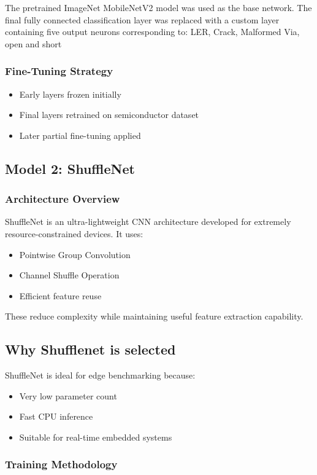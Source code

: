 The pretrained ImageNet MobileNetV2 model was used as the base network. The final fully connected classification layer was replaced with a custom layer containing five output neurons corresponding to: LER, Crack, Malformed Via, open and short
\subsubsection{ Fine-Tuning Strategy}
\begin{itemize}

\item Early layers frozen initially
\item Final layers retrained on semiconductor dataset
\item Later partial fine-tuning applied
\end{itemize}

\subsection{Model 2: ShuffleNet }

\subsubsection{Architecture Overview}
ShuffleNet is an ultra-lightweight CNN architecture developed for extremely resource-constrained devices. It uses:
\begin{itemize}
\item Pointwise Group Convolution
\item Channel Shuffle Operation
\item Efficient feature reuse
\end{itemize}

These reduce complexity while maintaining useful feature extraction capability.

\subsection{Why Shufflenet is selected}

ShuffleNet is ideal for edge benchmarking because:
\begin{itemize}
\item Very low parameter count
\item Fast CPU inference
\item Suitable for real-time embedded systems
\end{itemize}

\subsubsection{Training Methodology}

